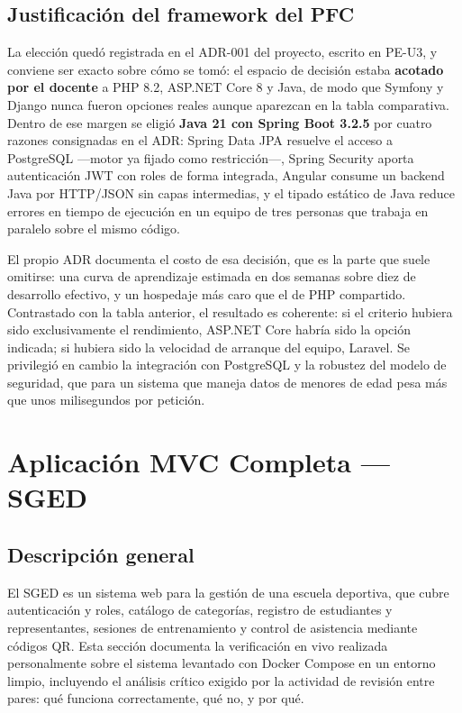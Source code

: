 \documentclass[12pt,a4paper]{article}
\begin{document}
\subsection{Justificación del framework del PFC}

La elección quedó registrada en el ADR-001 del proyecto, escrito en PE-U3, y conviene ser exacto
sobre cómo se tomó: el espacio de decisión estaba \textbf{acotado por el docente} a PHP 8.2,
ASP.NET Core 8 y Java, de modo que Symfony y Django nunca fueron opciones reales aunque
aparezcan en la tabla comparativa. Dentro de ese margen se eligió \textbf{Java 21 con Spring
Boot 3.2.5} por cuatro razones consignadas en el ADR: Spring Data JPA resuelve el acceso a
PostgreSQL ---motor ya fijado como restricción---, Spring Security aporta autenticación JWT con
roles de forma integrada, Angular consume un backend Java por HTTP/JSON sin capas intermedias, y
el tipado estático de Java reduce errores en tiempo de ejecución en un equipo de tres personas
que trabaja en paralelo sobre el mismo código.

El propio ADR documenta el costo de esa decisión, que es la parte que suele omitirse: una curva
de aprendizaje estimada en dos semanas sobre diez de desarrollo efectivo, y un hospedaje más caro
que el de PHP compartido. Contrastado con la tabla anterior, el resultado es coherente: si el
criterio hubiera sido exclusivamente el rendimiento, ASP.NET Core habría sido la opción
indicada; si hubiera sido la velocidad de arranque del equipo, Laravel. Se privilegió en cambio
la integración con PostgreSQL y la robustez del modelo de seguridad, que para un sistema que
maneja datos de menores de edad pesa más que unos milisegundos por petición.

\section{Aplicación MVC Completa --- SGED}
\label{sec:mvc}

\subsection{Descripción general}

El SGED es un sistema web para la gestión de una escuela deportiva, que cubre autenticación
y roles, catálogo de categorías, registro de estudiantes y representantes, sesiones de
entrenamiento y control de asistencia mediante códigos QR. Esta sección documenta la
verificación en vivo realizada personalmente sobre el sistema levantado con Docker Compose
en un entorno limpio, incluyendo el análisis crítico exigido por la actividad de revisión
entre pares: qué funciona correctamente, qué no, y por qué.
\end{document}
